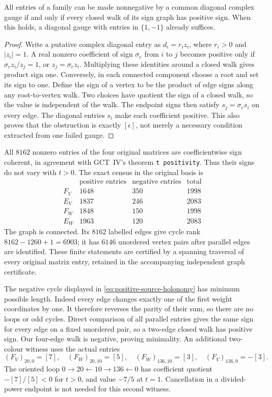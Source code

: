 \begin{lemma}\label{lem:positive-source-switching}
All entries of a family can be made nonnegative by a common diagonal
complex gauge if and only if every closed walk of its sign graph has
positive sign. When this holds, a diagonal gauge with entries in
$\{1,-1\}$ already suffices.
\end{lemma}
\begin{proof}
Write a putative complex diagonal entry as $d_i=r_i z_i$, where
$r_i>0$ and $|z_i|=1$. A real nonzero coefficient of sign $\sigma_e$
from $i$ to $j$ becomes positive only if
$\sigma_e z_i/z_j=1$, or $z_j=\sigma_e z_i$.
Multiplying these identities around a closed walk gives product sign
one. Conversely, in each connected component choose a root and set
its sign to one. Define the sign of a vertex to be the product of edge
signs along any root-to-vertex walk. Two choices have quotient the
sign of a closed walk, so the value is independent of the walk. The
endpoint signs then satisfy $s_j=\sigma_e s_i$ on every edge.
The diagonal entries $s_i$ make each coefficient positive. This also
proves that the obstruction is exactly $[\epsilon]$, not merely a
necessary condition extracted from one failed gauge.
\end{proof}

All $8162$ nonzero entries of the four original matrices are
coefficientwise sign coherent, in agreement with GCT~IV's theorem
\texttt{t positivity}. Thus their signs do not vary with $t>0$.
The exact census in the original basis is
\[
\begin{array}{c|r|r|r}
 &\text{positive entries}&\text{negative entries}&\text{total}\\\hline
 F_V&1648&350&1998\\
 E_V&1837&246&2083\\
 F_W&1848&150&1998\\
 E_W&1963&120&2083
\end{array}
\]
The graph is connected. Its $8162$ labelled edges give cycle rank
$8162-1260+1=6903$; it has $6146$ unordered vertex pairs after
parallel edges are identified. These finite statements are certified
by a spanning traversal of every original matrix entry, retained in
the accompanying independent graph certificate.

The negative cycle displayed in
\eqref{eq:positive-source-holonomy} has minimum possible length.
Indeed every edge changes exactly one of the first weight coordinates
by one. It therefore reverses the parity of their sum, so there are no
loops or odd cycles. Direct comparison of all parallel entries gives
the same sign for every edge on a fixed unordered pair, so a two-edge
closed walk has positive sign. Our four-edge walk is negative, proving
minimality. An additional two-colour witness uses the actual entries
\[
 (F_V)_{20,0}=[7],\quad (F_W)_{20,10}=[5],\quad
 (F_W)_{136,10}=[3],\quad (F_V)_{136,0}=-[3].
\]
The oriented loop $0\to20\leftarrow10\to136\leftarrow0$ has
coefficient quotient $-[7]/[5]<0$ for $t>0$, and value $-7/5$ at
$t=1$. Cancellation in a divided-power endpoint is not needed for
this second witness.

